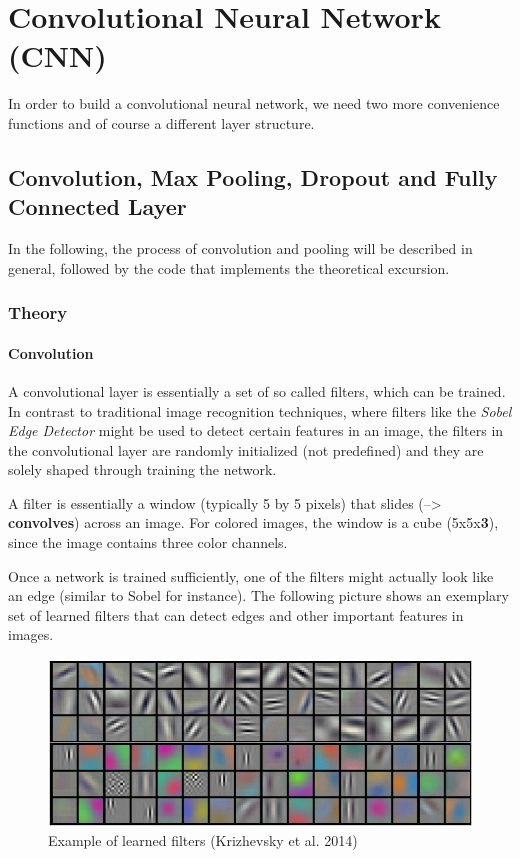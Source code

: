 \documentclass[]{article}
\let\oldparagraph\paragraph
\renewcommand{\paragraph}[1]{\oldparagraph{#1}\mbox{}}
\begin{document}
\section{Convolutional Neural Network
(CNN)}\label{convolutional-neural-network-cnn}

In order to build a convolutional neural network, we need two more
convenience functions and of course a different layer structure.

\subsection{Convolution, Max Pooling, Dropout and Fully Connected
Layer}\label{convolution-max-pooling-dropout-and-fully-connected-layer}

In the following, the process of convolution and pooling will be
described in general, followed by the code that implements the
theoretical excursion.

\subsubsection{Theory}\label{theory}

\paragraph{Convolution}\label{convolution}

A convolutional layer is essentially a set of so called filters, which
can be trained. In contrast to traditional image recognition techniques,
where filters like the \emph{Sobel Edge Detector} might be used to
detect certain features in an image, the filters in the convolutional
layer are randomly initialized (not predefined) and they are solely
shaped through training the network.

A filter is essentially a window (typically 5 by 5 pixels) that slides
(--\textgreater{} \textbf{convolves}) across an image. For colored
images, the window is a cube (5x5x\textbf{3}), since the image contains
three color channels.

Once a network is trained sufficiently, one of the filters might
actually look like an edge (similar to Sobel for instance). The
following picture shows an exemplary set of learned filters that can
detect edges and other important features in images.

\begin{figure}
\centering
\includegraphics{figures/learned_filters_example.jpeg}
\caption{Example of learned filters (Krizhevsky et al. 2014)}
\end{figure}
\end{document}
